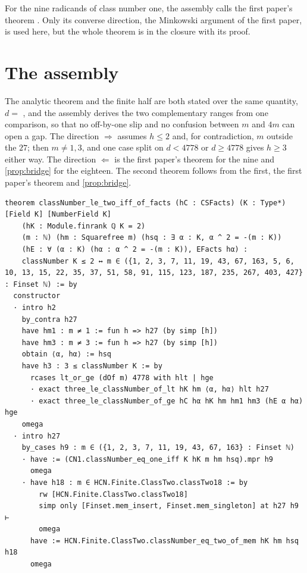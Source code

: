 \documentclass[11pt]{article}
\theoremstyle{definition}
\begin{document}
{For the nine radicands of class number one, the assembly calls the first paper's theorem . Only its converse direction, the Minkowski argument of the first paper, is used here, but the whole theorem is in the closure with its proof.

\section{The assembly}\label{sec:assembly}

The analytic theorem and the finite half are both stated over the same quantity, $d = $ , and the assembly derives the two complementary ranges from one comparison, so that no off-by-one slip and no confusion between $m$ and $4m$ can open a gap. The direction $\Rightarrow$ assumes $h \le 2$ and, for contradiction, $m$ outside the $27$; then $m \ne 1, 3$, and one case split on $d < 4778$ or $d \ge 4778$ gives $h \ge 3$ either way. The direction $\Leftarrow$ is the first paper's theorem for the nine and \cref{prop:bridge} for the eighteen. The second theorem follows from the first, the first paper's theorem and \cref{prop:bridge}.

\begin{lstlisting}
theorem classNumber_le_two_iff_of_facts (hC : CSFacts) (K : Type*) [Field K] [NumberField K]
    (hK : Module.finrank ℚ K = 2)
    (m : ℕ) (hm : Squarefree m) (hsq : ∃ α : K, α ^ 2 = -(m : K))
    (hE : ∀ (α : K) (hα : α ^ 2 = -(m : K)), EFacts hα) :
    classNumber K ≤ 2 ↔ m ∈ ({1, 2, 3, 7, 11, 19, 43, 67, 163, 5, 6, 10, 13, 15, 22, 35, 37, 51, 58, 91, 115, 123, 187, 235, 267, 403, 427} : Finset ℕ) := by
  constructor
  · intro h2
    by_contra h27
    have hm1 : m ≠ 1 := fun h => h27 (by simp [h])
    have hm3 : m ≠ 3 := fun h => h27 (by simp [h])
    obtain ⟨α, hα⟩ := hsq
    have h3 : 3 ≤ classNumber K := by
      rcases lt_or_ge (dOf m) 4778 with hlt | hge
      · exact three_le_classNumber_of_lt hK hm ⟨α, hα⟩ hlt h27
      · exact three_le_classNumber_of_ge hC hα hK hm hm1 hm3 (hE α hα) hge
    omega
  · intro h27
    by_cases h9 : m ∈ ({1, 2, 3, 7, 11, 19, 43, 67, 163} : Finset ℕ)
    · have := (CN1.classNumber_eq_one_iff K hK m hm hsq).mpr h9
      omega
    · have h18 : m ∈ HCN.Finite.ClassTwo.classTwo18 := by
        rw [HCN.Finite.ClassTwo.classTwo18]
        simp only [Finset.mem_insert, Finset.mem_singleton] at h27 h9 ⊢
        omega
      have := HCN.Finite.ClassTwo.classNumber_eq_two_of_mem hK hm hsq h18
      omega
\end{lstlisting}

}
\end{document}
